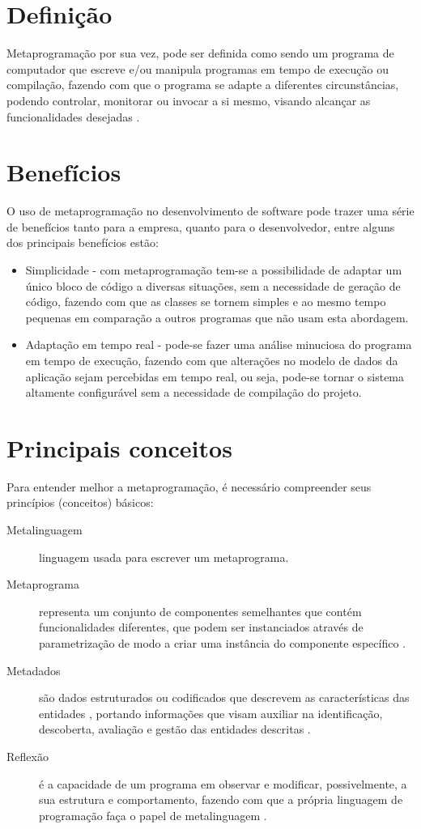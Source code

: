 \documentclass[tc,openright]{iiufrgs}
\begin{document}
\section{Definição}

Metaprogramação por sua vez, pode ser definida como sendo um programa de computador que escreve e/ou manipula programas em tempo de execução ou compilação, fazendo com que o programa se adapte a diferentes circunstâncias, podendo controlar, monitorar ou invocar a si mesmo, visando alcançar as funcionalidades desejadas \cite{hazzard2013metaprogramming}.
\section{Benefícios}
O uso de metaprogramação no desenvolvimento de software pode trazer uma série de benefícios tanto para a empresa, quanto para o desenvolvedor, entre alguns dos principais benefícios estão:

\begin{itemize}
\item Simplicidade - com metaprogramação tem-se a possibilidade de adaptar um único bloco de código a diversas situações, sem a necessidade de geração de código, fazendo com que as classes se tornem simples e ao mesmo tempo pequenas em comparação a outros programas que não usam esta abordagem.
\item Adaptação em tempo real - pode-se fazer uma análise minuciosa do programa em tempo de execução, fazendo com que alterações no modelo de dados da aplicação sejam percebidas em tempo real, ou seja, pode-se tornar o sistema altamente configurável sem a necessidade de compilação do projeto.
\end{itemize}

\section{Principais conceitos}
Para entender melhor a metaprogramação, é necessário compreender seus princípios (conceitos) básicos:

\begin{description}
\item [Metalinguagem]  linguagem usada para escrever um metaprograma.
\item [Metaprograma ] representa um conjunto de componentes semelhantes que contém funcionalidades diferentes, que podem ser instanciados através de parametrização de modo a criar uma instância do componente específico \cite{damavsevivcius2008taxonomy}.
\item [Metadados] são dados estruturados ou codificados que descrevem as características das entidades , portando informações que visam auxiliar na identificação,  descoberta, avaliação e gestão das entidades descritas \cite{american1999task}.
\item [Reflexão] é a capacidade de um programa em observar e modificar, possivelmente, a sua estrutura e comportamento, fazendo com que a própria linguagem de programação faça o papel de metalinguagem \cite{malenfant1996tutorial}.
\end{description}
\end{document}

